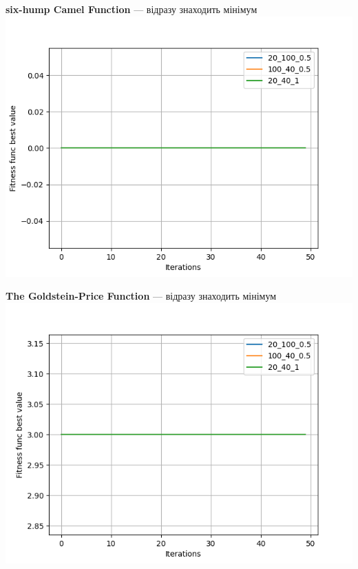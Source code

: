 \documentclass{article}
\begin{document}
        \newpage

        \textbf{six-hump Camel Function} --- відразу знаходить мінімум \\
        \includegraphics{six-hump Camel function.png}
        
        \newpage

        \textbf{The Goldstein-Price Function} --- відразу знаходить мінімум \\
        \includegraphics{The Goldstein-Price function.png}
\end{document}
